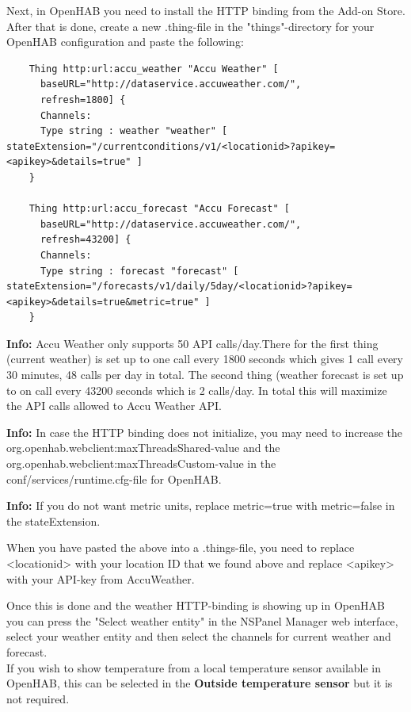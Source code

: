 \documentclass[10pt]{article}
\newcommand{\info}[1]{\begin{infoBox} \textbf{Info:} #1 \end{infoBox}}
\begin{document}
    Next, in OpenHAB you need to install the HTTP binding from the Add-on Store. After that is done, create a new .thing-file in the "things"-directory for your OpenHAB configuration and paste the following:
    \begin{lstlisting}
    Thing http:url:accu_weather "Accu Weather" [
      baseURL="http://dataservice.accuweather.com/",
      refresh=1800] {
      Channels:
      Type string : weather "weather" [ stateExtension="/currentconditions/v1/<locationid>?apikey=<apikey>&details=true" ]
    }

    Thing http:url:accu_forecast "Accu Forecast" [
      baseURL="http://dataservice.accuweather.com/",
      refresh=43200] {
      Channels:
      Type string : forecast "forecast" [ stateExtension="/forecasts/v1/daily/5day/<locationid>?apikey=<apikey>&details=true&metric=true" ]
    }
    \end{lstlisting}
    \info{Accu Weather only supports 50 API calls/day.There for the first thing (current weather) is set up to one call every 1800 seconds which gives 1 call every 30 minutes, 48 calls per day in total. The second thing (weather forecast is set up to on call every 43200 seconds which is 2 calls/day. In total this will maximize the API calls allowed to Accu Weather API.}
    \info{In case the HTTP binding does not initialize, you may need to increase the org.openhab.webclient:maxThreadsShared-value and the org.openhab.webclient:maxThreadsCustom-value in the conf/services/runtime.cfg-file for OpenHAB.}
    \info{If you do not want metric units, replace metric=true with metric=false in the stateExtension.}
    When you have pasted the above into a .things-file, you need to replace <locationid> with your location ID that we found above and replace <apikey> with your API-key from AccuWeather.
    
    Once this is done and the weather HTTP-binding is showing up in OpenHAB you can press the "Select weather entity" in the NSPanel Manager web interface, select your weather entity and then select the channels for current weather and forecast.
    \\
    If you wish to show temperature from a local temperature sensor available in OpenHAB, this can be selected in the \textbf{Outside temperature sensor} but it is not required.
    
    \hypertarget{sec:global_settings}{}
\end{document}
